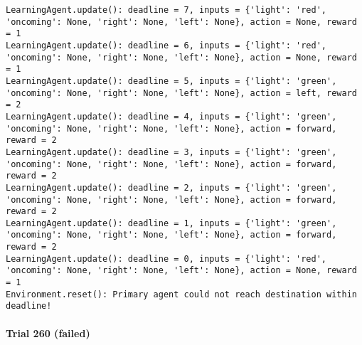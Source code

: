 \documentclass{article}
\begin{document}
\begin{verbatim}
LearningAgent.update(): deadline = 7, inputs = {'light': 'red', 'oncoming': None, 'right': None, 'left': None}, action = None, reward = 1
LearningAgent.update(): deadline = 6, inputs = {'light': 'red', 'oncoming': None, 'right': None, 'left': None}, action = None, reward = 1
LearningAgent.update(): deadline = 5, inputs = {'light': 'green', 'oncoming': None, 'right': None, 'left': None}, action = left, reward = 2
LearningAgent.update(): deadline = 4, inputs = {'light': 'green', 'oncoming': None, 'right': None, 'left': None}, action = forward, reward = 2
LearningAgent.update(): deadline = 3, inputs = {'light': 'green', 'oncoming': None, 'right': None, 'left': None}, action = forward, reward = 2
LearningAgent.update(): deadline = 2, inputs = {'light': 'green', 'oncoming': None, 'right': None, 'left': None}, action = forward, reward = 2
LearningAgent.update(): deadline = 1, inputs = {'light': 'green', 'oncoming': None, 'right': None, 'left': None}, action = forward, reward = 2
LearningAgent.update(): deadline = 0, inputs = {'light': 'red', 'oncoming': None, 'right': None, 'left': None}, action = None, reward = 1
Environment.reset(): Primary agent could not reach destination within deadline!
\end{verbatim}

\paragraph{Trial 260 (failed)}\label{trial-260-failed}
\end{document}
